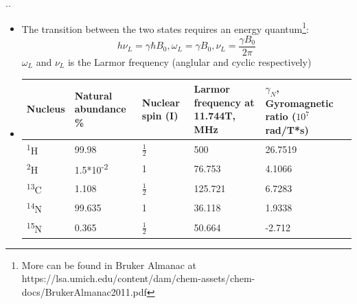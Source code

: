 \documentclass[handout]{beamer}
\begin{document}
\begin{frame}{\thesection.\thesubsection. \insertsubsection}
	\begin{itemize}[<+>]
		\item The transition between the two states requires an energy quantum\footnote{More can be found in Bruker Almanac at https://lsa.umich.edu/content/dam/chem-assets/chem-docs/BrukerAlmanac2011.pdf}:
		\begin{equation}
			h \nu_L = \gamma \hbar B_0, \omega_L = \gamma B_0, \nu_L = \dfrac{\gamma B_0}{2 \pi}
		\end{equation}
		$\omega_L$ and $\nu_L$ is the Larmor frequency (anglular and cyclic respectively)
		\item
		
\begin{table}[ht]
	\centering
	\begin{tabular}{  C{1.0cm}  C{2.5cm}  C{1.0cm}  C{2.0cm}  C{2.0cm}}
		\hline\hline
		Nucleus & Natural abundance \% & Nuclear spin (I) & Larmor frequency at 11.744T, MHz & $\gamma_N$, Gyromagnetic ratio ($10^7$ rad/T*s) \\
		\hline
		\textsuperscript{1}H & 99.98 & $\frac{1}{2}$ & 500 & 26.7519 \\
		\textsuperscript{2}H & 1.5*10\textsuperscript{-2} & 1 & 76.753 & 4.1066 \\
		\textsuperscript{13}C & 1.108 & $\frac{1}{2}$ & 125.721 & 6.7283 \\
		\textsuperscript{14}N & 99.635 & 1 & 36.118 & 1.9338 \\
		\textsuperscript{15}N & 0.365 &  $\frac{1}{2}$ & 50.664 & -2.712 \\
		\hline
	\end{tabular}
\end{table}
		
	\end{itemize}
\end{frame}
\end{document}
